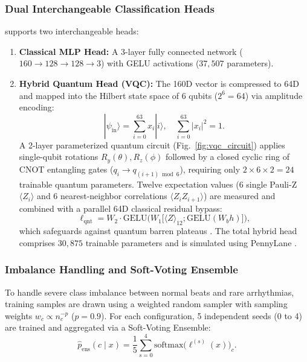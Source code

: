 \subsubsection{Dual Interchangeable Classification Heads}
\RRN{} supports two interchangeable heads:
\begin{enumerate}
    \item \textbf{Classical MLP Head:} A 3-layer fully connected network ($160 \to 128 \to 128 \to 3$) with GELU activations ($37{,}507$ parameters).
    \item \textbf{Hybrid Quantum Head (VQC):} The 160D vector is compressed to 64D and mapped into the Hilbert state space of 6 qubits ($2^6 = 64$) via amplitude encoding:
    \begin{equation}
    |\psi_{\mathrm{in}}\rangle = \sum_{i=0}^{63} x_i |i\rangle, \quad \sum_{i=0}^{63} |x_i|^2 = 1.
    \end{equation}
    A 2-layer parameterized quantum circuit (Fig.~\ref{fig:vqc_circuit}) applies single-qubit rotations $R_y(\theta), R_z(\phi)$ followed by a closed cyclic ring of CNOT entangling gates ($q_i \to q_{(i+1)\bmod 6}$), requiring only $2 \times 6 \times 2 = 24$ trainable quantum parameters. Twelve expectation values (6 single Pauli-Z $\langle Z_i \rangle$ and 6 nearest-neighbor correlations $\langle Z_i Z_{i+1} \rangle$) are measured and combined with a parallel 64D classical residual bypass:
    \begin{equation}
    \ell_{\mathrm{qnt}} = W_2 \cdot \mathrm{GELU}\Big(W_1 \big[\langle Z \rangle_{12}; \mathrm{GELU}(W_b h)\big]\Big),
    \end{equation}
    which safeguards against quantum barren plateaus \cite{mcclean2018}. The total hybrid head comprises $30{,}875$ trainable parameters and is simulated using PennyLane \cite{pennylane2018}.
\end{enumerate}

\subsubsection{Imbalance Handling and Soft-Voting Ensemble}
To handle severe class imbalance between normal beats and rare arrhythmias, training samples are drawn using a weighted random sampler with sampling weights $w_c \propto n_c^{-p}$ ($p=0.9$). For each configuration, 5 independent seeds (0 to 4) are trained and aggregated via a Soft-Voting Ensemble:
\begin{equation}
\hat{p}_{\mathrm{ens}}(c \mid x) = \frac{1}{5}\sum_{s=0}^4 \mathrm{softmax}\big(\ell^{(s)}(x)\big)_c.
\end{equation}
